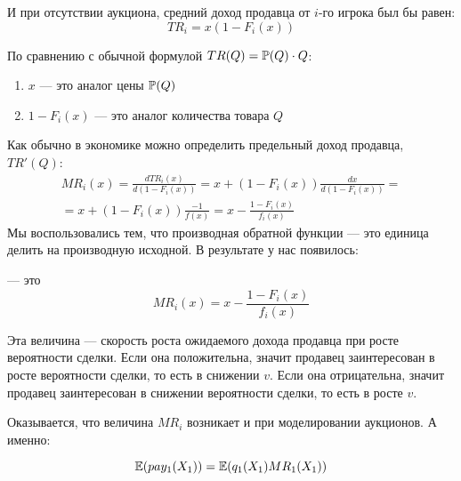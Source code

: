 И при отсутствии аукциона, средний доход продавца от $ i $-го игрока был бы равен:
\begin{equation}
TR_{i}=x(1-F_{i}(x))
\end{equation}

По сравнению с обычной формулой $ TR(Q)=\P(Q)\cdot Q $:
\begin{enumerate}
\item $ x $ — это аналог цены $ \P(Q) $
\item $ 1-F_{i}(x) $ — это аналог количества товара $ Q $
\end{enumerate}

Как обычно в экономике можно определить предельный доход продавца, $ TR'(Q) $:
\begin{multline}
MR_{i}(x)=\frac{d TR_{i}(x)}{d(1-F_{i}(x))}=x+(1-F_{i}(x))\frac{dx}{d(1-F_{i}(x))}=\\
=x+(1-F_{i}(x))\frac{-1}{f(x)}=x-\frac{1-F_{i}(x)}{f_{i}(x)}
\end{multline}
Мы воспользовались тем, что производная обратной функции — это единица делить на производную исходной.
В результате у нас появилось:
\begin{mydef}
 — это
\begin{equation}
MR_{i}(x)=x-\frac{1-F_{i}(x)}{f_{i}(x)}
\end{equation}
\end{mydef}

Эта величина — скорость роста ожидаемого дохода продавца при росте вероятности сделки. Если она положительна, значит продавец заинтересован в росте вероятности сделки, то есть в снижении $ v $. Если она отрицательна, значит продавец заинтересован в снижении вероятности сделки, то есть в росте $ v $.

Оказывается, что величина $ MR_{i} $ возникает и при моделировании аукционов. А именно:

\begin{myth}
\begin{equation}
\E(pay_{1}(X_{1}))=\E(q_{1}(X_{1})MR_{1}(X_{1}))
\end{equation}
\end{myth}

